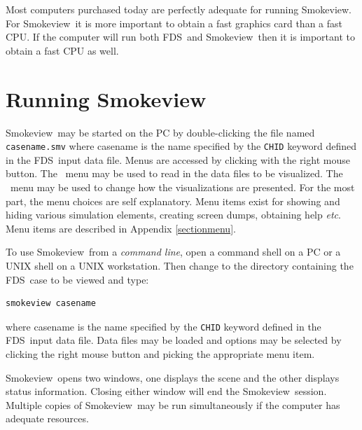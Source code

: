 \documentclass[11pt,twoside]{book}
\newcommand{\fds}{{FDS}}
\newcommand{\Smokeview}{{Smokeview}}
\newcommand{\smokeview}{{Smokeview}}
\newcommand{\etc}{{\em etc}}
\newcommand{\loadmenu}{\fbox{\tt Load/Unload} }
\newcommand{\showmenu}{\fbox{\tt Show/Hide} }
\begin{document}
Most computers purchased today are perfectly adequate for running \smokeview.
For \smokeview\ it is more important to obtain a fast graphics card
than a fast CPU. If the computer will run both \fds\ and \smokeview\,
then it is important to obtain a fast CPU as well.


\section{Running Smokeview}

\Smokeview\  may be started on the PC by double-clicking the file
named {\tt casename.smv} where casename is the name specified by
the {\tt CHID} keyword defined in the \fds\ input data file. Menus
are accessed by clicking with the right mouse button.  The
\loadmenu\ menu may be used to read in the data files to be
visualized. The \showmenu\ menu may be used to change how the
visualizations are presented. For the most part, the menu choices
are self explanatory. Menu items exist for showing and hiding
various simulation elements, creating screen dumps, obtaining help
\etc. Menu items are described in Appendix \ref{sectionmenu}.


To use \smokeview\ from a {\em command line}, open a command shell on a PC
or a UNIX shell on a UNIX workstation.  Then change to the directory
containing the \fds\ case to be viewed and type:
\begin{verbatim}
smokeview casename
\end{verbatim}
where casename is the name specified by the {\tt CHID} keyword
defined in the \fds\ input data file. Data files may be loaded and
options may be selected by clicking the right mouse button and
picking the appropriate menu item.


\smokeview\ opens two windows, one displays the scene and
the other displays status information. Closing either
window will end the \smokeview\ session.  Multiple copies
of \smokeview\ may be run simultaneously if the computer
has adequate resources.
\end{document}
